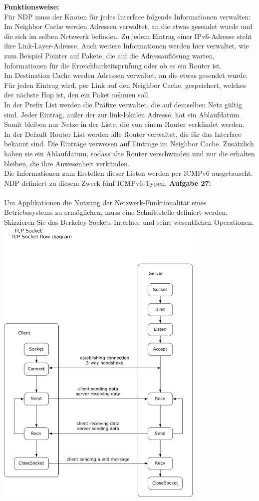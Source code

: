 \documentclass[12pt,a4paper]{report}
\begin{document}
\textbf{Funktionsweise:}
\\
Für NDP muss der Knoten für jedes Interface folgende Informationen verwalten:\\
Im Neighbor Cache werden Adressen verwaltet, an die etwas gesendet wurde und die sich im selben Netzwerk befinden. Zu jedem Eintrag einer IPv6-Adresse steht ihre Link-Layer-Adresse. Auch weitere Informationen werden hier verwaltet, wie zum Beispiel Pointer auf Pakete, die auf die Adressauflösung warten, Informationen für die Erreichbarkeitsprüfung oder ob es ein Router ist.\\
Im Destination Cache werden Adressen verwaltet, an die etwas gesendet wurde. Für jeden Eintrag wird, per Link auf den Neighbor Cache, gespeichert, welches der nächste Hop ist, den ein Paket nehmen soll.\\
In der Prefix List werden die Präfixe verwaltet, die auf demselben Netz gültig sind. Jeder Eintrag, außer der zur link-lokalen Adresse, hat ein Ablaufdatum. Somit bleiben nur Netze in der Liste, die von einem Router verkündet werden.\\
In der Default Router List werden alle Router verwaltet, die für das Interface bekannt sind. Die Einträge verweisen auf Einträge im Neighbor Cache. Zusätzlich haben sie ein Ablaufdatum, sodass alte Router verschwinden und nur die erhalten bleiben, die ihre Anwesenheit verkünden.\\
Die Informationen zum Erstellen dieser Listen werden per ICMPv6 ausgetauscht. NDP definiert zu diesem Zweck fünf ICMPv6-Typen.
\newpage
\textbf{Aufgabe 27:}
\\
\\
Um Applikationen die Nutzung der Netzwerk-Funktionalität eines Betriebssystems zu
ermöglichen, muss eine Schnittstelle definiert werden. Skizzieren Sie das Berkeley-Sockets
Interface und seine wesentlichen Operationen.
\\
\includegraphics[width=10cm]{27.png}
\end{document}
